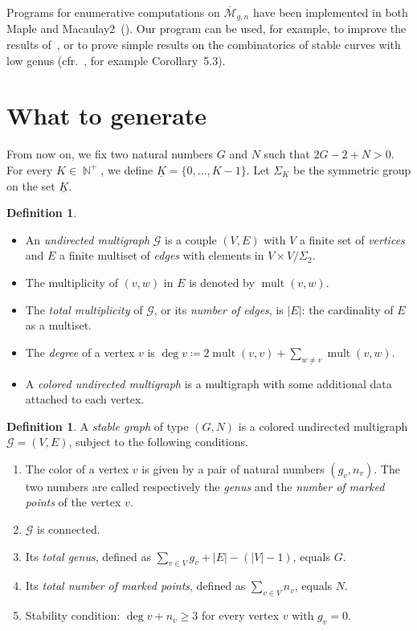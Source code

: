 \documentclass{amsart}
\theoremstyle{plain}
\theoremstyle{definition}
\newtheorem{definition}[theorem]{Definition}
\DeclareMathOperator{\bN}{\mathbb{N}}
\DeclareMathOperator{\mult}{mult}
\newcommand{\graph}{\mathcal{G}}
\newcommand{\abs}[1]{\left|#1\right|}
\newcommand{\ubar}[1]{\underline{#1}}
\begin{document}
Programs for enumerative computations on
$\overline{\mathcal{M}}_{g,n}$ have been implemented in both Maple and
Macaulay2~(\cite{faber,stephanie1,smith}). Our program can be used,
for example, to improve the results of~\cite[Section 5]{stephanie2},
or to prove simple results on the combinatorics of stable curves with
low genus (cfr.~\cite{busonero}, for example Corollary~5.3).



\section{What to generate}

From now on, we fix two natural numbers $G$ and $N$ such that $2
G-2+N>0$.  For every $K \in \bN^+$, we define $\ubar{K} = \{0, \dots,
K-1\}$. Let $\Sigma_K$ be the symmetric group on the set $\ubar{K}$.

\begin{definition}
  \mbox{}
  \begin{itemize}
  \item An \emph{undirected multigraph\/} $\graph$ is a couple $(V,
    E)$ with $V$ a finite set of \emph{vertices\/} and $E$ a finite
    multiset of \emph{edges\/} with elements in $V \times V/\Sigma_2$.
  \item The multiplicity of $(v, w)$ in $E$ is denoted by $\mult(v,
    w)$.
  \item The \emph{total multiplicity\/} of $\graph$, or its
    \emph{number of edges}, is $\abs{E}$: the cardinality of $E$ as a
    multiset.
  \item The \emph{degree\/} of a vertex $v$ is $\deg v \coloneqq 2
    \mult(v, v) + \sum_{w \neq v} \mult(v, w)$.
  \item A \emph{colored undirected multigraph\/} is a multigraph with
    some additional data attached to each vertex.
  \end{itemize}
\end{definition}

\begin{definition}\label{def:stable graph}
  A \emph{stable graph\/} of type $(G, N)$ is a colored undirected
  multigraph $\graph = (V, E)$, subject to the following conditions.
  \begin{enumerate}
  \item The color of a vertex $v$ is given by a pair of natural
    numbers $(g_v, n_v)$. The two numbers are called respectively 
    the \emph{genus} and the \emph{number of marked points} of the vertex $v$.
  \item\label{it:condition connected} $\graph$ is connected.
  \item\label{it:condition genus} Its \emph{total genus}, defined as
    $\sum_{v \in V} g_v + \abs{E} - (\abs{V} - 1)$, equals $G$.
  \item Its \emph{total number of marked points}, defined as $\sum_{v
      \in V} n_v$, equals $N$.
  \item\label{it:condition stability} Stability condition: $\deg v +
    n_v \geq 3$ for every vertex $v$ with $g_v = 0$.
  \end{enumerate}
\end{definition}
\end{document}

